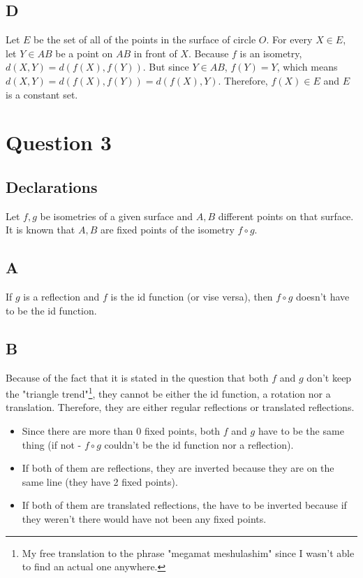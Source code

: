 \documentclass[12pt, oneside]{article}
\begin{document}
\subsection{D}
Let $E$ be the set of all of the points in the surface of circle $O$. For every $X \in E$, let $Y \in AB$ be a point on $AB$ in front of $X$. Because $f$ is an isometry, $d(X, Y) = d(f(X), f(Y))$. But since $Y \in AB$, $f(Y) = Y$, which means $d(X, Y) = d(f(X), f(Y)) = d(f(X), Y)$. Therefore, $f(X) \in E$ and $E$ is a constant set.
\clearpage

\section{Question 3}
\setcounter{subsection}{-1}
\subsection{Declarations}
Let $f, g$ be isometries of a given surface and $A, B$ different points on that surface. It is known that $A, B$ are fixed points of the isometry $f \circ g$.

\subsection{A}
If $g$ is a reflection and $f$ is the id function (or vise versa), then $f \circ g$ doesn't have to be the id function.

\subsection{B}
Because of the fact that it is stated in the question that both $f$ and $g$ don't keep the "triangle trend"\footnote{My free translation to the phrase "megamat meshulashim" since I wasn't able to find an actual one anywhere.}, they cannot be either the id function, a rotation nor a translation. Therefore, they are either regular reflections or translated reflections.

\begin{itemize}
\item Since there are more than 0 fixed points, both $f$ and $g$ have to be the same thing (if not - $f \circ g$ couldn't be the id function nor a reflection).
\item If both of them are reflections, they are inverted because they are on the same line (they have 2 fixed points).
\item If both of them are translated reflections, the have to be inverted because if they weren't there would have not been any fixed points.
\end{itemize}
\end{document}
